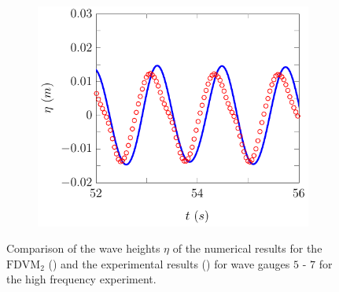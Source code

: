\begin{figure}
\begin{subfigure}{0.5\textwidth}
	\end{subfigure}
	\begin{subfigure}{0.5\textwidth}
		\includegraphics[width=\textwidth]{./chp6/figures/Experiment/Beji/sh/FDVMWG7.pdf}
		\vspace{0.5cm}
	\end{subfigure}
	\caption{Comparison of the wave heights $\eta$ of the numerical results for the $\text{FDVM}_2$ ({\color{blue}\solidrule}) and the experimental results () for wave gauges $5$ - $7$ for the high frequency experiment.}
	\label{fig:BejishWG5to7FDVM}
\end{figure}

